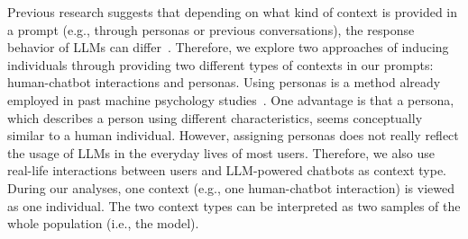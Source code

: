\documentclass{DESSThesis}
\begin{document}
Previous research suggests that depending on what kind of context is provided in a prompt (e.g., through personas or previous conversations), the response behavior of LLMs can differ~\cite{argyle_out_2023, kovac_large_2023}.
Therefore, we explore two approaches of inducing individuals through providing two different types of contexts in our prompts: human-chatbot interactions and personas. Using personas is a method already employed in past machine psychology studies~\cite{dorner_personality_2023, serapio-garcia_personality_2023}. One advantage is that a persona, which describes a person using different characteristics, seems conceptually similar to a human individual. However, assigning personas does not really reflect the usage of LLMs in the everyday lives of most users. Therefore, we also use real-life interactions between users and LLM-powered chatbots as context type. During our analyses, one context (e.g., one human-chatbot interaction) is viewed as one individual. The two context types can be interpreted as two samples of the whole population (i.e., the model).


\end{document}
